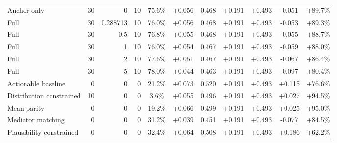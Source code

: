 \begin{table}[htbp]
\begin{tabular}{lrrrccccccc}
Anchor only & 30 & 0 & 10 & 75.6\% & +0.056 & 0.468 & +0.191 & +0.493 & -0.051 & +89.7\% \\
Full & 30 & 0.288713 & 10 & 76.0\% & +0.056 & 0.468 & +0.191 & +0.493 & -0.053 & +89.3\% \\
Full & 30 & 0.5 & 10 & 76.8\% & +0.055 & 0.468 & +0.191 & +0.493 & -0.055 & +88.7\% \\
Full & 30 & 1 & 10 & 76.0\% & +0.054 & 0.467 & +0.191 & +0.493 & -0.059 & +88.0\% \\
Full & 30 & 2 & 10 & 77.6\% & +0.051 & 0.467 & +0.191 & +0.493 & -0.067 & +86.4\% \\
Full & 30 & 5 & 10 & 78.0\% & +0.044 & 0.463 & +0.191 & +0.493 & -0.097 & +80.4\% \\
Actionable baseline & 0 & 0 & 0 & 21.2\% & +0.073 & 0.520 & +0.191 & +0.493 & +0.115 & +76.6\% \\
Distribution constrained & 10 & 0 & 0 & 3.6\% & +0.055 & 0.496 & +0.191 & +0.493 & +0.027 & +94.5\% \\
Mean parity & 0 & 0 & 0 & 19.2\% & +0.066 & 0.499 & +0.191 & +0.493 & +0.025 & +95.0\% \\
Mediator matching & 0 & 0 & 0 & 31.2\% & +0.039 & 0.451 & +0.191 & +0.493 & -0.077 & +84.5\% \\
Plausibility constrained & 0 & 0 & 0 & 32.4\% & +0.064 & 0.508 & +0.191 & +0.493 & +0.186 & +62.2\% \\
\bottomrule
\end{tabular}
\end{table}